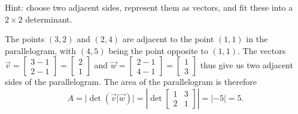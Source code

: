 \documentclass[12pt]{article}
\newcommand{\bbm}{\begin{bmatrix}}
\newcommand{\ebm}{\end{bmatrix}}
\begin{document}
\begin{enumerate}
Hint: choose two adjacent sides, represent them as vectors, and fit these into a $2\times 2$ determinant.

\bigskip

The points $(3,2)$ and $(2,4)$ are adjacent to the point $(1,1)$ in the parallelogram, with $(4,5)$ being the point opposite to $(1,1)$. The vectors $\vec{v} = \bbm 3-1\\2-1\ebm = \bbm 2\\1\ebm$ and $\vec{w} = \bbm 2-1\\4-1\ebm = \bbm 1\\3\ebm$ thus give us two adjacent sides of the parallelogram. The area of the parallelogram is therefore
\[
 A = \lvert \det(\vec{v}\vert \vec{w})\rvert = \left\lvert \det\bbm 1&3\\2&1\ebm \right\rvert = \lvert -5\rvert = 5.
\]

 
\end{enumerate}
\end{document}
